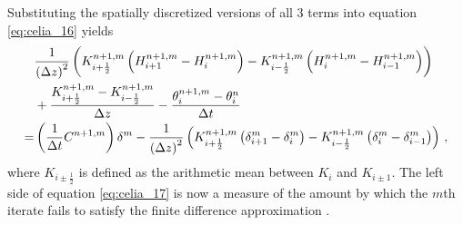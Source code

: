 Substituting the spatially discretized versions of all 3 terms into equation \eqref{eq:celia_16} yields \parencite{celia_general_1990}
\begin{equation}
  \label{eq:celia_17}
  \begin{split}
    &\frac{1}{\del{ \Delta z }^2} \del{ K_{i+\frac{1}{2}}^{n+1,m} \del{ H_{i+1}^{n+1,m} - H_{i}^{n+1,m} } - K_{i-\frac{1}{2}}^{n+1,m} \del{ H_{i}^{n+1,m} - H_{i-1}^{n+1,m} } } \\
    &+ \frac{K_{i+\frac{1}{2}}^{n+1,m} - K_{i-\frac{1}{2}}^{n+1,m}}{\Delta z} - \frac{\theta_i^{n+1,m} - \theta_i^{n}}{\Delta t} \\
    = &\del{ \frac{1}{\Delta t} C^{n+1,m} } \delta^m - \frac{1}{\del{ \Delta z }^2} \del{ K_{i+\frac{1}{2}}^{n+1,m} \del{ \delta_{i+1}^{m} - \delta_{i}^{m} } - K_{i-\frac{1}{2}}^{n+1,m} \del{ \delta_{i}^{m} - \delta_{i-1}^{m} } }  \, ,
  \end{split}
\end{equation}
where $K_{i\pm\frac{1}{2}}$ is defined as the arithmetic mean between $K_i$ and $K_{i\pm1}$.  The left side of equation \eqref{eq:celia_17} is now a measure of the amount by which the $m$th iterate fails to satisfy the finite difference approximation \parencite{celia_general_1990}.

